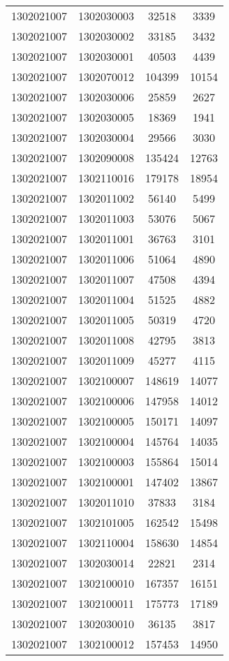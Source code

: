 \begin{longtable}{llcc}
1302021007 & 1302030003 & 32518 & 3339\\
1302021007 & 1302030002 & 33185 & 3432\\
1302021007 & 1302030001 & 40503 & 4439\\
1302021007 & 1302070012 & 104399 & 10154\\
1302021007 & 1302030006 & 25859 & 2627\\
1302021007 & 1302030005 & 18369 & 1941\\
1302021007 & 1302030004 & 29566 & 3030\\
1302021007 & 1302090008 & 135424 & 12763\\
1302021007 & 1302110016 & 179178 & 18954\\
1302021007 & 1302011002 & 56140 & 5499\\
1302021007 & 1302011003 & 53076 & 5067\\
1302021007 & 1302011001 & 36763 & 3101\\
1302021007 & 1302011006 & 51064 & 4890\\
1302021007 & 1302011007 & 47508 & 4394\\
1302021007 & 1302011004 & 51525 & 4882\\
1302021007 & 1302011005 & 50319 & 4720\\
1302021007 & 1302011008 & 42795 & 3813\\
1302021007 & 1302011009 & 45277 & 4115\\
1302021007 & 1302100007 & 148619 & 14077\\
1302021007 & 1302100006 & 147958 & 14012\\
1302021007 & 1302100005 & 150171 & 14097\\
1302021007 & 1302100004 & 145764 & 14035\\
1302021007 & 1302100003 & 155864 & 15014\\
1302021007 & 1302100001 & 147402 & 13867\\
1302021007 & 1302011010 & 37833 & 3184\\
1302021007 & 1302101005 & 162542 & 15498\\
1302021007 & 1302110004 & 158630 & 14854\\
1302021007 & 1302030014 & 22821 & 2314\\
1302021007 & 1302100010 & 167357 & 16151\\
1302021007 & 1302100011 & 175773 & 17189\\
1302021007 & 1302030010 & 36135 & 3817\\
1302021007 & 1302100012 & 157453 & 14950\\

\end{longtable}
